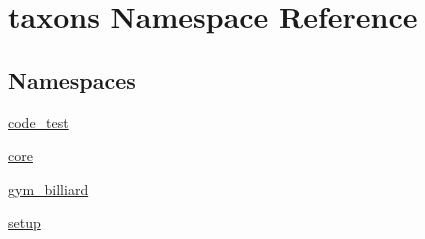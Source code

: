 \hypertarget{namespacetaxons}{}\section{taxons Namespace Reference}
\label{namespacetaxons}
\subsection*{Namespaces}
\begin{DoxyCompactItemize}
\item 
 \hyperlink{namespacetaxons_1_1code__test}{code\+\_\+test}
\item 
 \hyperlink{namespacetaxons_1_1core}{core}
\item 
 \hyperlink{namespacetaxons_1_1gym__billiard}{gym\+\_\+billiard}
\item 
 \hyperlink{namespacetaxons_1_1setup}{setup}
\end{DoxyCompactItemize}
